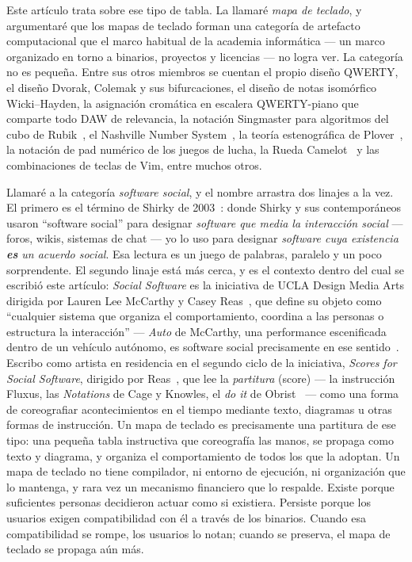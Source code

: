 \documentclass[10pt,letterpaper,twocolumn]{article}
\begin{document}
Este artículo trata sobre ese tipo de tabla. La llamaré \emph{mapa de teclado}, y argumentaré que los mapas de teclado forman una categoría de artefacto computacional que el marco habitual de la academia informática --- un marco organizado en torno a binarios, proyectos y licencias --- no logra ver. La categoría no es pequeña. Entre sus otros miembros se cuentan el propio diseño QWERTY, el diseño Dvorak, Colemak y sus bifurcaciones, el diseño de notas isomórfico Wicki--Hayden, la asignación cromática en escalera QWERTY-piano que comparte todo DAW de relevancia, la notación Singmaster para algoritmos del cubo de Rubik~\citep{singmaster1981notes}, el Nashville Number System~\citep{matthews1984nashville}, la teoría estenográfica de Plover~\citep{knight2010plover}, la notación de pad numérico de los juegos de lucha, la Rueda Camelot~\citep{davis1991camelot} y las combinaciones de teclas de Vim, entre muchos otros.

Llamaré a la categoría \emph{software social}, y el nombre arrastra dos linajes a la vez. El primero es el término de Shirky de 2003~\citep{shirky2003etech,allen2004socialsoftware}: donde Shirky y sus contemporáneos usaron ``software social'' para designar \emph{software que media la interacción social} --- foros, wikis, sistemas de chat --- yo lo uso para designar \emph{software cuya existencia \textbf{es} un acuerdo social}. Esa lectura es un juego de palabras, paralelo y un poco sorprendente. El segundo linaje está más cerca, y es el contexto dentro del cual se escribió este artículo: \emph{Social Software} es la iniciativa de UCLA Design\,\textbar\,Media Arts dirigida por Lauren Lee McCarthy y Casey Reas~\citep{sosoft_info}, que define su objeto como ``cualquier sistema que organiza el comportamiento, coordina a las personas o estructura la interacción'' --- \emph{Auto} de McCarthy, una performance escenificada dentro de un vehículo autónomo, es software social precisamente en ese sentido~\citep{mccarthy2026auto}. Escribo como artista en residencia en el segundo ciclo de la iniciativa, \emph{Scores for Social Software}, dirigido por Reas~\citep{reas2026scores}, que lee la \emph{partitura} (score) --- la instrucción Fluxus, las \emph{Notations} de Cage y Knowles, el \emph{do it} de Obrist~\citep{cage1969notations,obrist1997doit} --- como una forma de coreografiar acontecimientos en el tiempo mediante texto, diagramas u otras formas de instrucción. Un mapa de teclado es precisamente una partitura de ese tipo: una pequeña tabla instructiva que coreografía las manos, se propaga como texto y diagrama, y organiza el comportamiento de todos los que la adoptan. Un mapa de teclado no tiene compilador, ni entorno de ejecución, ni organización que lo mantenga, y rara vez un mecanismo financiero que lo respalde. Existe porque suficientes personas decidieron actuar como si existiera. Persiste porque los usuarios exigen compatibilidad con él a través de los binarios. Cuando esa compatibilidad se rompe, los usuarios lo notan; cuando se preserva, el mapa de teclado se propaga aún más.
\end{document}
